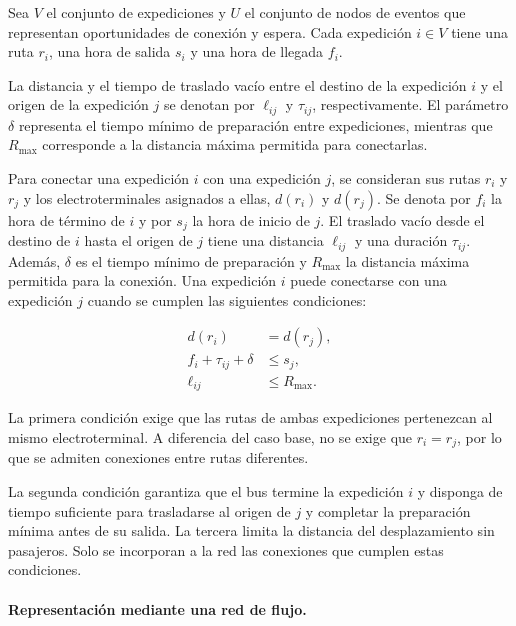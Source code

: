Sea $V$ el conjunto de expediciones y $U$ el conjunto de nodos de eventos
que representan oportunidades de conexión y espera. Cada expedición
$i \in V$ tiene una ruta $r_i$, una hora de salida $s_i$ y una hora
de llegada $f_i$.

La distancia y el tiempo de traslado vacío entre el destino de la
expedición $i$ y el origen de la expedición $j$ se denotan por
$\ell_{ij}$ y $\tau_{ij}$, respectivamente. El parámetro $\delta$
representa el tiempo mínimo de preparación entre expediciones, mientras
que $R_{\max}$ corresponde a la distancia máxima permitida para conectarlas.

Para conectar una expedición $i$ con una expedición $j$, se consideran
sus rutas $r_i$ y $r_j$ y los electroterminales asignados a ellas,
$d(r_i)$ y $d(r_j)$. Se denota por $f_i$ la hora de término de $i$
y por $s_j$ la hora de inicio de $j$. El traslado vacío desde el
destino de $i$ hasta el origen de $j$ tiene una distancia
$\ell_{ij}$ y una duración $\tau_{ij}$. Además, $\delta$ es el
tiempo mínimo de preparación y $R_{\max}$ la distancia máxima
permitida para la conexión. 
Una expedición $i$ puede conectarse con una expedición $j$ cuando
se cumplen las siguientes condiciones:

\begin{equation}
    \begin{aligned}
        d(r_i) &= d(r_j), \\
        f_i + \tau_{ij} + \delta &\leq s_j, \\
        \ell_{ij} &\leq R_{\max}.
    \end{aligned}
\end{equation}

La primera condición exige que las rutas de ambas expediciones
pertenezcan al mismo electroterminal. A diferencia del caso base,
no se exige que $r_i = r_j$, por lo que se admiten conexiones entre
rutas diferentes.

La segunda condición garantiza que el bus termine la expedición $i$
y disponga de tiempo suficiente para trasladarse al origen de $j$
y completar la preparación mínima antes de su salida. La tercera
limita la distancia del desplazamiento sin pasajeros. Solo se incorporan
a la red las conexiones que cumplen estas condiciones.

\paragraph{Representación mediante una red de flujo.}

